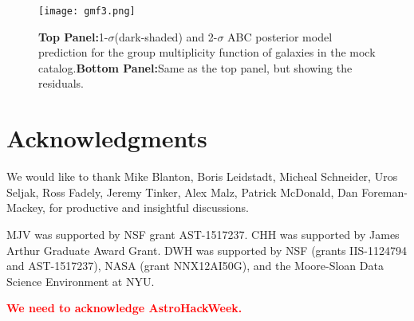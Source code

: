 \documentclass[12pt, preprint]{aastex}
\newcommand{\todo}[1]{{\bf \textcolor{red}{ #1}}}
\begin{document}
\begin{figure*}
\begin{center}
  \texttt{[image: gmf3.png]}
\caption{{\bf Top Panel:}1-$\sigma$(dark-shaded) and 2-$\sigma$ ABC posterior model prediction 
for the group multiplicity function of galaxies in the mock catalog.{\bf Bottom Panel:}Same as the top panel, but showing the residuals.}
\label{fig:2pcf-model}
\end{center}
\end{figure*}

\section*{Acknowledgments}

We would like to thank Mike Blanton, Boris Leidstadt, Micheal Schneider, 
Uros Seljak, Ross Fadely, Jeremy Tinker, Alex Malz, Patrick McDonald, Dan 
Foreman-Mackey, for productive and insightful discussions. 

MJV was supported by NSF grant AST-1517237. CHH was supported by James 
Arthur Graduate Award Grant. DWH was supported by NSF (grants IIS-1124794 
and AST-1517237), NASA (grant NNX12AI50G), and the Moore-Sloan Data Science 
Environment at NYU.

\todo{We need to acknowledge AstroHackWeek.}



\end{document}
